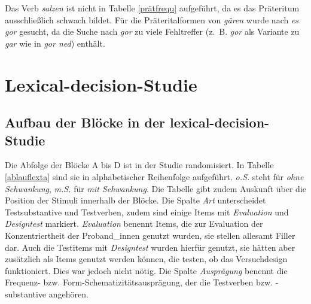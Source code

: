 \noindent Das Verb \textit{salzen} ist nicht in Tabelle \ref{prätfrequ} aufgeführt, da es das Präteritum ausschließlich schwach bildet. Für die Präteritalformen von \textit{gären} wurde nach \textit{es gor} gesucht, da die Suche nach \textit{gor} zu viele Fehltreffer (z.~B. \textit{gor} als Variante zu \textit{gar} wie in \textit{gor ned}) enthält. 

\chapter{Lexical-decision-Studie}
\section{Aufbau der Blöcke in der lexical-decision-Studie}
\label{blocklex}

Die Abfolge der Blöcke A bis D ist in der Studie randomisiert. In Tabelle \ref{ablauflexta} sind sie in alphabetischer Reihenfolge aufgeführt. \textit{o.S.} steht für \textit{ohne Schwankung}, \textit{m.S.} für \textit{mit Schwankung}. Die Tabelle gibt zudem Auskunft über die Position der Stimuli innerhalb der Blöcke. Die Spalte \textit{Art} unterscheidet Testsubstantive und Testverben, zudem sind einige Items mit \textit{Evaluation} und \textit{Designtest} markiert. \textit{Evaluation} benennt Items, die zur Evaluation der Konzentriertheit der Proband\_innen genutzt wurden, sie stellen allesamt Filler dar. Auch die Test\-items mit \textit{Designtest} wurden hierfür genutzt, sie hätten aber zusätzlich als Items genutzt werden können, die testen, ob das Versuchdesign funktioniert. Dies war jedoch nicht nötig. Die Spalte \textit{Ausprägung} benennt die Frequenz- bzw. Form-Schematizitätsausprägung, der die Testverben bzw. -substantive angehören.

